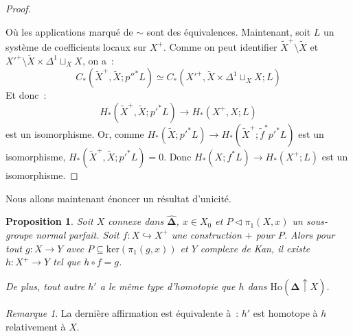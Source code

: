 \documentclass{amsart}
\theoremstyle{plain}
\newtheorem{prop}[theo]{Proposition}
\theoremstyle{definition}
\theoremstyle{remark}
\newtheorem{rem}[theo]{Remarque}
\newcommand{\DEns}{\widehat{\mathbf{\Delta}}}
\newcommand{\Ho}[1]{\mathrm{Ho}({#1})}
\newcommand{\ra}{\rightarrow}
\newcommand{\lra}{\longrightarrow}
\newcommand{\myker}[1]{\mathrm{ker}({#1})}
\begin{document}
\begin{proof}
\begin{center}
\begin{tikzcd}[column sep = large, row sep = large]
    \end{tikzcd}
  \end{center}
  Où les applications marqué de $\sim$ sont des équivalences.
  Maintenant, soit $L$ un système de coefficients locaux sur $X^+$. Comme on peut identifier $\tilde{X}^+\setminus \tilde{X}$
  et $X'^+\setminus \tilde{X}\times\Delta^1\sqcup_{X}X$, on a~:
  $$C_*(\tilde{X}^+,\tilde{X};p''^*L)\simeq C_*(X'^+, \tilde{X}\times\Delta^1\sqcup_{X}X;L)$$
  Et donc~: $$H_*(\tilde{X}^+,\tilde{X};p'^*L)\lra H_*(X^+,X;L)$$ est un isomorphisme.
  Or, comme $H_*(\tilde{X};p'^*L)\ra H_*(\tilde{X}^+;\tilde{f}^*p'^*L)$ est un isomorphisme, $H_*(\tilde{X}^+,\tilde{X};p'^*L)=0$.
  Donc $H_*(X;f^*L)\ra H_*(X^+;L)$ est un isomorphisme.
\end{proof}

Nous allons maintenant énoncer un résultat d'unicité.

\begin{prop}\label{topologiepluspropuniv}
  Soit $X$ connexe dans $\DEns$, $x\in X_0$ et $P\triangleleft \pi_1(X,x)$ un sous-groupe normal parfait. Soit $f:X\hookrightarrow X^+$ une construction $+$
  pour $P$. Alors pour tout $g:X\ra Y$ avec $P\subseteq \myker{\pi_1(g,x)}$ et $Y$ complexe de Kan, il existe $h:X^+\ra Y$ tel que $h\circ f=g$.
  \begin{center}
  \end{center}
  De plus, tout autre $h'$ a le même type d'homotopie que $h$ dans $\Ho{\DEns\uparrow X}$. 
\end{prop}

\begin{rem}
  La dernière affirmation est équivalente à~: $h'$ est homotope à $h$ relativement à $X$. 
\end{rem}
\end{document}
